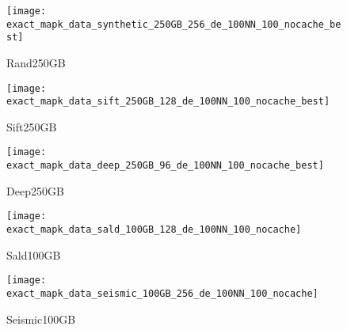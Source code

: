 {{\begin{figure*}[tb]
\begin{minipage}{0.76\textwidth}
	\begin{subfigure}{0.18\textwidth}
		\centering
		\texttt{[image: exact\_mapk\_data\_synthetic\_250GB\_256\_de\_100NN\_100\_nocache\_best]}
		\caption{Rand250GB} 
		\label{fig:approx:accuracy:data:synthetic:250GB:256:hdd:de:100NN:100:nocache:best}
	\end{subfigure}
	\begin{subfigure}{0.18\textwidth}
		\centering
		\texttt{[image: exact\_mapk\_data\_sift\_250GB\_128\_de\_100NN\_100\_nocache\_best]}
		\caption{Sift250GB} 
		\label{fig:approx:accuracy:data:sift:250GB:128:hdd:de:100NN:100:nocache:best}
	\end{subfigure}
	\begin{subfigure}{0.18\textwidth}
		\centering
		\texttt{[image: exact\_mapk\_data\_deep\_250GB\_96\_de\_100NN\_100\_nocache\_best]}
		\caption{Deep250GB} 
		\label{fig:approx:accuracy:data:deep:250GB:96:hdd:de:100NN:100:nocache:best}
	\end{subfigure}
	\begin{subfigure}{0.18\textwidth}
		\centering
		\texttt{[image: exact\_mapk\_data\_sald\_100GB\_128\_de\_100NN\_100\_nocache]}
		\caption{Sald100GB} 
		\label{fig:approx:accuracy:data:sald:100GB:128:hdd:de:100NN:100:nocache:best}
	\end{subfigure}
	\begin{subfigure}{0.18\textwidth}
		\centering
		\texttt{[image: exact\_mapk\_data\_seismic\_100GB\_256\_de\_100NN\_100\_nocache]}
		\caption{Seismic100GB} 
		\label{fig:approx:accuracy:data:seismic:100GB:256:hdd:de:100NN:100:nocache:best}
	\end{subfigure}


\end{minipage}
\end{figure*}}}
